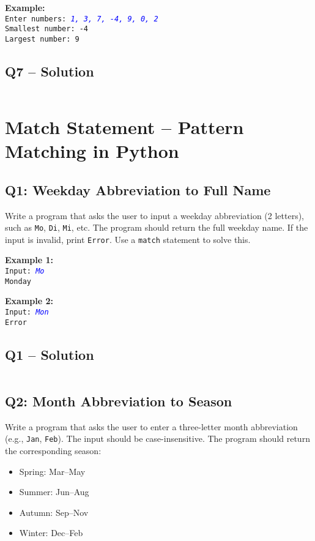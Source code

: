 \documentclass[a4paper,11pt]{article}
\begin{document}
	\textbf{Example:}\\
	\texttt{Enter numbers: \textcolor{blue}{\textit{1, 3, 7, -4, 9, 0, 2}}}\\
	\texttt{Smallest number: -4}\\
	\texttt{Largest number: 9}
	
		
	\subsection*{Q7 – Solution}
		\inputminted{python}{Files/1/7.py}
		
	\section{Match Statement – Pattern Matching in Python}
	
	\subsection*{Q1: Weekday Abbreviation to Full Name}
	Write a program that asks the user to input a weekday abbreviation (2 letters), such as \texttt{Mo}, \texttt{Di}, \texttt{Mi}, etc. The program should return the full weekday name. If the input is invalid, print \texttt{Error}. Use a \texttt{match} statement to solve this.
	
	\textbf{Example 1:}\\
	\texttt{Input: \textcolor{blue}{\textit{Mo}}}\\
	\texttt{Monday}
	
	\textbf{Example 2:}\\
	\texttt{Input: \textcolor{blue}{\textit{Mon}}}\\
	\texttt{Error}
	
		\subsection*{Q1 – Solution}
	\inputminted{python}{Files/2/1.py}
	
	\subsection*{Q2: Month Abbreviation to Season}
	Write a program that asks the user to enter a three-letter month abbreviation (e.g., \texttt{Jan}, \texttt{Feb}). The input should be case-insensitive. The program should return the corresponding season:
	
	\begin{itemize}
		\item Spring: Mar–May
		\item Summer: Jun–Aug
		\item Autumn: Sep–Nov
		\item Winter: Dec–Feb
	\end{itemize}
	
\end{document}

